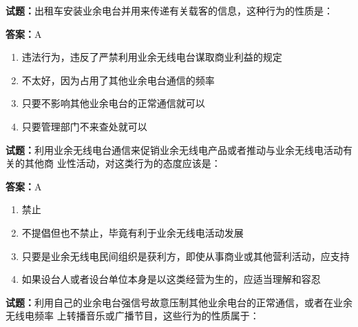 \documentclass{ctexbook}
\begin{document}




\vspace{1em}

\textbf{试题：}出租车安装业余电台并用来传递有关载客的信息，这种行为的性质是： 

\textbf{答案：}A 

\begin{enumerate}[leftmargin=3em]
  \item 违法行为，违反了严禁利用业余无线电台谋取商业利益的规定 

  \item 不太好，因为占用了其他业余电台通信的频率 

  \item 只要不影响其他业余电台的正常通信就可以 

  \item 只要管理部门不来查处就可以 

\end{enumerate}





\vspace{1em}

\textbf{试题：}利用业余无线电台通信来促销业余无线电产品或者推动与业余无线电活动有关的其他商
业性活动，对这类行为的态度应该是： 

\textbf{答案：}A 

\begin{enumerate}[leftmargin=3em]
  \item 禁止 

  \item 不提倡但也不禁止，毕竟有利于业余无线电活动发展 

  \item 只要是业余无线电民间组织是获利方，即使从事商业或其他营利活动，应支持 

  \item 如果设台人或者设台单位本身是以这类经营为生的，应适当理解和容忍 

\end{enumerate}





\vspace{1em}

\textbf{试题：}利用自己的业余电台强信号故意压制其他业余电台的正常通信，或者在业余无线电频率
上转播音乐或广播节目，这些行为的性质属于： 
\end{document}
